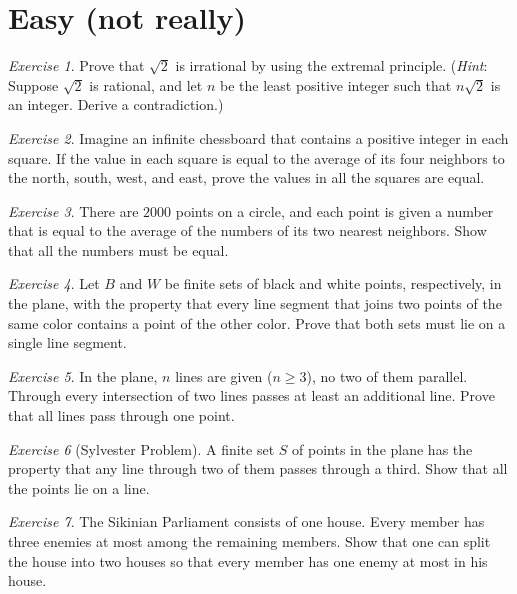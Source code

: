 \documentclass{article}
\theoremstyle{definition}
\theoremstyle{remark}
\newtheorem{exercise}{Exercise}
\begin{document}
\section{Easy (not really)}
\begin{exercise}
    Prove that $\sqrt{2}$ is irrational by using the extremal principle. (\emph{Hint}: Suppose $\sqrt{2}$ is rational, and let $n$ be the least positive integer such that $n\sqrt{2}$ is an integer. Derive a contradiction.)
\end{exercise}

\begin{exercise}
Imagine an infinite chessboard that contains a positive integer in each square. If the value in each square is equal to the average of its four neighbors to the north, south, west, and east, prove the values in all the squares are equal. 
\end{exercise}

\begin{exercise}
    There are $2000$ points on a circle, and each point is given a number that is equal to the average of the numbers of its two nearest neighbors. Show that all the numbers must be equal.
\end{exercise}

\begin{exercise}
   Let $B$ and $W$ be finite sets of black and white points, respectively, in the plane, with the property that every line segment that joins two points of the same color contains a point of the other color. Prove that both sets must lie on a single line segment.
\end{exercise}

\begin{exercise}
    In the plane, $n$ lines are given ($n \geq 3$), no two of them parallel. Through every intersection of two lines passes at least an additional line. Prove that all lines pass through one point. 
\end{exercise}


\begin{exercise}[Sylvester Problem]
    A finite set $S$ of points in the plane has the property that any line through two of them passes through a third. Show that all the points lie on a line. 
\end{exercise}

\begin{exercise}
    The Sikinian Parliament consists of one house. Every member has three enemies at most among the remaining members. Show that one can split the house into two houses so that every member has one enemy at most in his house. 
\end{exercise}
\end{document}
